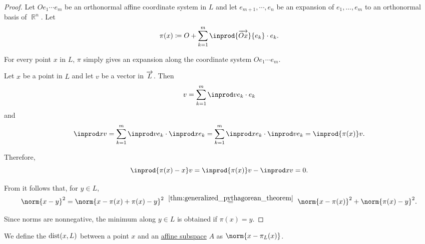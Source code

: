 \begin{proof}
  Let \( O e_1 \cdots e_m \) be an orthonormal affine coordinate system in \( L \) and let \( e_{m+1}, \cdots, e_n \) be an expansion of \( e_1, \ldots, e_m \) to an orthonormal basis of \( \BbbR^n \). Let
  \begin{equation*}
    \pi(x) \coloneqq O + \sum_{k=1}^m \inprod {\vect{Ox}} {e_k} \cdot e_k.
  \end{equation*}

   For every point \( x \) in \( L \), \( \pi \) simply gives an expansion along the coordinate system \( O e_1 \cdots e_m \).

   Let \( x \) be a point in \( L \) and let \( v \) be a vector in \( \overrightarrow{L} \). Then
  \begin{equation*}
    v = \sum_{k=1}^m \inprod v {e_k} \cdot e_k
  \end{equation*}
  and
  \begin{equation*}
    \inprod x v
    =
    \sum_{k=1}^m \inprod v {e_k} \cdot \inprod x {e_k}
    =
    \sum_{k=1}^m \inprod x {e_k} \cdot \inprod v {e_k}
    =
    \inprod {\pi(x)} v.
  \end{equation*}

  Therefore,
  \begin{equation*}
    \inprod {\pi(x) - x} v
    =
    \inprod {\pi(x)} v - \inprod x v
    =
    0.
  \end{equation*}

   From  it follows that, for \( y \in L \),
  \begin{equation*}
    \norm{ x - y }^2
    =
    \norm{ x - \pi(x) + \pi(x) - y }^2
    \reloset {\ref{thm:generalized_pythagorean_theorem}} =
    \norm{ x - \pi(x) }^2 + \norm{ \pi(x) - y }^2.
  \end{equation*}

  Since norms are nonnegative, the minimum along \( y \in L \) is obtained if \( \pi(x) = y \).
\end{proof}

\begin{definition}\label{def:distance_to_subspace}
  We define the  \( \op{dist}(x, L) \) between a point \( x \) and an \hyperref[def:affine_subspace]{affine subspace} \( A \) as \( \norm{ x - \pi_L(x) } \).
\end{definition}

